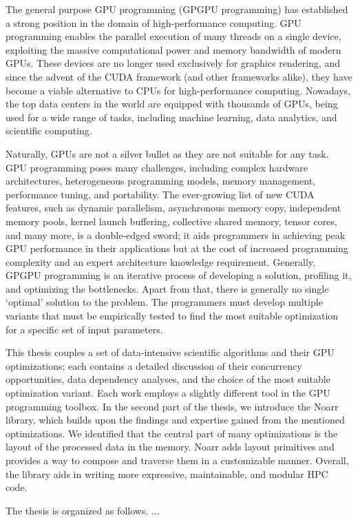 
The general purpose GPU programming (GPGPU programming) has established a strong position in the domain of high-performance computing. 
GPU programming enables the parallel execution of many threads on a single device, exploiting the massive computational power and memory bandwidth of modern GPUs. 
These devices are no longer used exclusively for graphics rendering, and since the advent of the CUDA framework (and other frameworks alike), they have become a viable alternative to CPUs for high-performance computing.
Nowadays, the top data centers in the world are equipped with thousands of GPUs, being used for a wide range of tasks, including machine learning, data analytics, and scientific computing.

Naturally, GPUs are not a silver bullet as they are not suitable for any task. 
GPU programming poses many challenges, including complex hardware architectures, heterogeneous programming models, memory management, performance tuning, and portability.
The ever-growing list of new CUDA features, such as dynamic parallelism, asynchronous memory copy, independent memory pools, kernel launch buffering, collective shared memory, tensor cores, and many more, is a double-edged sword; 
it aids programmers in achieving peak GPU performance in their applications but at the cost of increased programming complexity and an expert architecture knowledge requirement.
Generally, GPGPU programming is an iterative process of developing a solution, profiling it, and optimizing the bottlenecks.
Apart from that, there is generally no single `optimal' solution to the problem. The programmers must develop multiple variants that must be empirically tested to find the most suitable optimization for a specific set of input parameters.

This thesis couples a set of data-intensive scientific algorithms and their GPU optimizations; each contains a detailed discussion of their concurrency opportunities, data dependency analyses, and the choice of the most suitable optimization variant. Each work employs a slightly different tool in the GPU programming toolbox. 
In the second part of the thesis, we introduce the Noarr library, which builds upon the findings and expertise gained from the mentioned optimizations. We identified that the central part of many optimizations is the layout of the processed data in the memory. 
Noarr adds layout primitives and provides a way to compose and traverse them in a customizable manner. Overall, the library aids in writing more expressive, maintainable, and modular HPC code.

The thesis is organized as follows. ...

